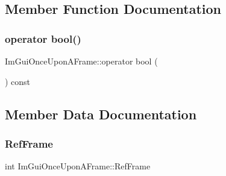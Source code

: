 \subsection{Member Function Documentation}
\hypertarget{struct_im_gui_once_upon_a_frame_a3c912b79bc333ce746356001431c2504}{}\label{struct_im_gui_once_upon_a_frame_a3c912b79bc333ce746356001431c2504} 
\subsubsection{\texorpdfstring{operator bool()}{operator bool()}}
{\footnotesize\ttfamily Im\+Gui\+Once\+Upon\+A\+Frame\+::operator bool (\begin{DoxyParamCaption}{ }\end{DoxyParamCaption}) const}



\subsection{Member Data Documentation}
\hypertarget{struct_im_gui_once_upon_a_frame_a2d44776b8e7bdeec217f88be9f832e08}{}\label{struct_im_gui_once_upon_a_frame_a2d44776b8e7bdeec217f88be9f832e08} 
\subsubsection{\texorpdfstring{Ref\+Frame}{RefFrame}}
{\footnotesize\ttfamily int Im\+Gui\+Once\+Upon\+A\+Frame\+::\+Ref\+Frame\hspace{0.3cm}{\ttfamily [mutable]}}

